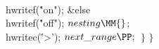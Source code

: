 \\{hwritef}(\.{"on"});\2\6
\&{else}\1\5
\\{hwritef}(\.{"off"});\2\6
${}\index{nesting+\\{nesting}}\\{nesting}\MM{}$;\5
\\{hwritec}(\.{'>'});\6
${}\index{next range+\\{next\_range}}\\{next\_range}\PP;{}$\6
\4${}\}{}$\2\6
\4${}\}{}$\2
\Y
\fi


